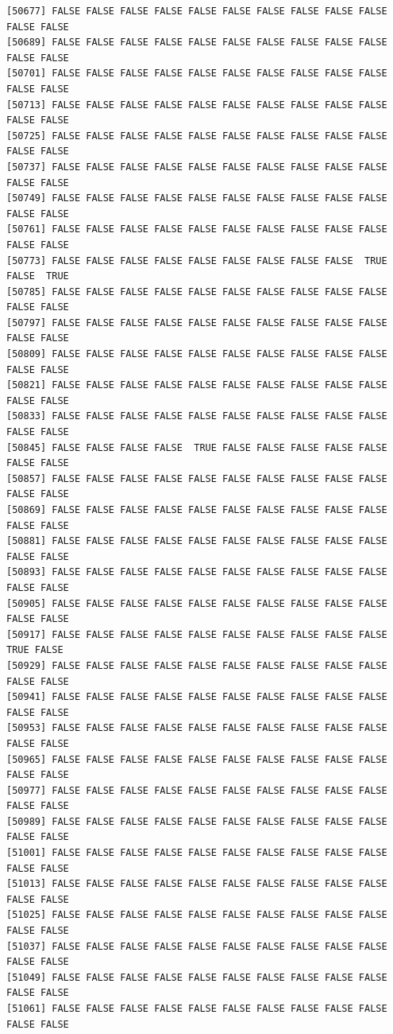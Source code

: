 \documentclass[
  a4paper,
  DIV=11,
  numbers=noendperiod]{scrartcl}
\begin{document}
\begin{verbatim}
[50677] FALSE FALSE FALSE FALSE FALSE FALSE FALSE FALSE FALSE FALSE FALSE FALSE
[50689] FALSE FALSE FALSE FALSE FALSE FALSE FALSE FALSE FALSE FALSE FALSE FALSE
[50701] FALSE FALSE FALSE FALSE FALSE FALSE FALSE FALSE FALSE FALSE FALSE FALSE
[50713] FALSE FALSE FALSE FALSE FALSE FALSE FALSE FALSE FALSE FALSE FALSE FALSE
[50725] FALSE FALSE FALSE FALSE FALSE FALSE FALSE FALSE FALSE FALSE FALSE FALSE
[50737] FALSE FALSE FALSE FALSE FALSE FALSE FALSE FALSE FALSE FALSE FALSE FALSE
[50749] FALSE FALSE FALSE FALSE FALSE FALSE FALSE FALSE FALSE FALSE FALSE FALSE
[50761] FALSE FALSE FALSE FALSE FALSE FALSE FALSE FALSE FALSE FALSE FALSE FALSE
[50773] FALSE FALSE FALSE FALSE FALSE FALSE FALSE FALSE FALSE  TRUE FALSE  TRUE
[50785] FALSE FALSE FALSE FALSE FALSE FALSE FALSE FALSE FALSE FALSE FALSE FALSE
[50797] FALSE FALSE FALSE FALSE FALSE FALSE FALSE FALSE FALSE FALSE FALSE FALSE
[50809] FALSE FALSE FALSE FALSE FALSE FALSE FALSE FALSE FALSE FALSE FALSE FALSE
[50821] FALSE FALSE FALSE FALSE FALSE FALSE FALSE FALSE FALSE FALSE FALSE FALSE
[50833] FALSE FALSE FALSE FALSE FALSE FALSE FALSE FALSE FALSE FALSE FALSE FALSE
[50845] FALSE FALSE FALSE FALSE  TRUE FALSE FALSE FALSE FALSE FALSE FALSE FALSE
[50857] FALSE FALSE FALSE FALSE FALSE FALSE FALSE FALSE FALSE FALSE FALSE FALSE
[50869] FALSE FALSE FALSE FALSE FALSE FALSE FALSE FALSE FALSE FALSE FALSE FALSE
[50881] FALSE FALSE FALSE FALSE FALSE FALSE FALSE FALSE FALSE FALSE FALSE FALSE
[50893] FALSE FALSE FALSE FALSE FALSE FALSE FALSE FALSE FALSE FALSE FALSE FALSE
[50905] FALSE FALSE FALSE FALSE FALSE FALSE FALSE FALSE FALSE FALSE FALSE FALSE
[50917] FALSE FALSE FALSE FALSE FALSE FALSE FALSE FALSE FALSE FALSE  TRUE FALSE
[50929] FALSE FALSE FALSE FALSE FALSE FALSE FALSE FALSE FALSE FALSE FALSE FALSE
[50941] FALSE FALSE FALSE FALSE FALSE FALSE FALSE FALSE FALSE FALSE FALSE FALSE
[50953] FALSE FALSE FALSE FALSE FALSE FALSE FALSE FALSE FALSE FALSE FALSE FALSE
[50965] FALSE FALSE FALSE FALSE FALSE FALSE FALSE FALSE FALSE FALSE FALSE FALSE
[50977] FALSE FALSE FALSE FALSE FALSE FALSE FALSE FALSE FALSE FALSE FALSE FALSE
[50989] FALSE FALSE FALSE FALSE FALSE FALSE FALSE FALSE FALSE FALSE FALSE FALSE
[51001] FALSE FALSE FALSE FALSE FALSE FALSE FALSE FALSE FALSE FALSE FALSE FALSE
[51013] FALSE FALSE FALSE FALSE FALSE FALSE FALSE FALSE FALSE FALSE FALSE FALSE
[51025] FALSE FALSE FALSE FALSE FALSE FALSE FALSE FALSE FALSE FALSE FALSE FALSE
[51037] FALSE FALSE FALSE FALSE FALSE FALSE FALSE FALSE FALSE FALSE FALSE FALSE
[51049] FALSE FALSE FALSE FALSE FALSE FALSE FALSE FALSE FALSE FALSE FALSE FALSE
[51061] FALSE FALSE FALSE FALSE FALSE FALSE FALSE FALSE FALSE FALSE FALSE FALSE

\end{verbatim}
\end{document}

